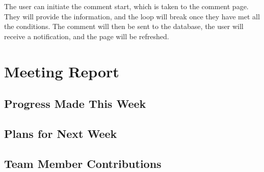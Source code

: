 \documentclass[12pt]{article}
\begin{document}
The user can initiate the comment start, which is taken to the comment page. They will provide the information, and the loop will break once they have met all the conditions. The comment will then be sent to the database, the user will receive a notification, and the page will be refreshed.

\section{Meeting Report}

\subsection{Progress Made This Week}

\subsection{Plans for Next Week}
\subsection{Team Member Contributions}
\end{document}
